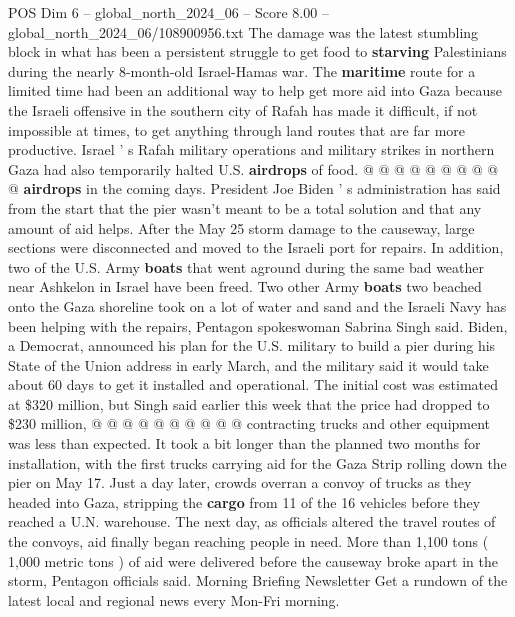 \begin{textsample}{POS Dim 6 – global\_north\_2024\_06 – Score 8.00 – global\_north\_2024\_06/108900956.txt}
The damage was the latest stumbling block in what has been a persistent struggle to get food to \textbf{starving} Palestinians during the nearly 8-month-old Israel-Hamas war.
The \textbf{maritime} route for a limited time had been an additional way to help get more aid into Gaza because the Israeli offensive in the southern city of Rafah has made it difficult, if not impossible at times, to get anything through land routes that are far more productive.
Israel ' s Rafah military operations and military strikes in northern Gaza had also temporarily halted U.S. \textbf{airdrops} of food. @ @ @ @ @ @ @ @ @ @ \textbf{airdrops} in the coming days.
President Joe Biden ' s administration has said from the start that the pier wasn't meant to be a total solution and that any amount of aid helps.
After the May 25 storm damage to the causeway, large sections were disconnected and moved to the Israeli port for repairs.
In addition, two of the U.S.
Army \textbf{boats} that went aground during the same bad weather near Ashkelon in Israel have been freed.
Two other Army \textbf{boats} two beached onto the Gaza shoreline took on a lot of water and sand and the Israeli Navy has been helping with the repairs, Pentagon spokeswoman Sabrina Singh said.
Biden, a Democrat, announced his plan for the U.S. military to build a pier during his State of the Union address in early March, and the military said it would take about 60 days to get it installed and operational.
The initial cost was estimated at \$320 million, but Singh said earlier this week that the price had dropped to \$230 million, @ @ @ @ @ @ @ @ @ @ contracting trucks and other equipment was less than expected.
It took a bit longer than the planned two months for installation, with the first trucks carrying aid for the Gaza Strip rolling down the pier on May 17.
Just a day later, crowds overran a convoy of trucks as they headed into Gaza, stripping the \textbf{cargo} from 11 of the 16 vehicles before they reached a U.N. warehouse.
The next day, as officials altered the travel routes of the convoys, aid finally began reaching people in need.
More than 1,100 tons ( 1,000 metric tons ) of aid were delivered before the causeway broke apart in the storm, Pentagon officials said.
Morning Briefing Newsletter Get a rundown of the latest local and regional news every Mon-Fri morning.

\end{textsample}
